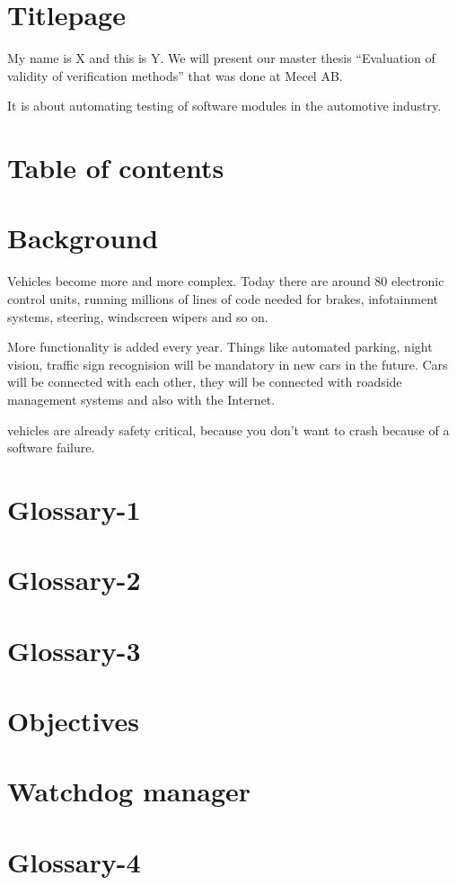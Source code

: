 \documentclass[a4paper]{article}
\begin{document}
\section{Titlepage}
My name is X and this is Y. We will present our master thesis
``Evaluation of validity of verification methods'' that was done at
Mecel AB.

It is about automating testing of software modules in the automotive
industry.

\section{Table of contents}

\section{Background}
Vehicles become more and more complex. Today there are around 80
electronic control units, running millions of lines of code needed for
brakes, infotainment systems, steering, windscreen wipers and so on.

More functionality is added every year. Things like automated parking,
night vision, traffic sign recognision will be mandatory in new cars
in the future. Cars will be connected with each other, they will be
connected with roadside management systems and also with the Internet.

vehicles are already safety critical, because you don't want to crash
because of a software failure.
\section{Glossary-1}
\section{Glossary-2}
\section{Glossary-3}
\section{Objectives}
\section{Watchdog manager}
\section{Glossary-4}
\end{document}
